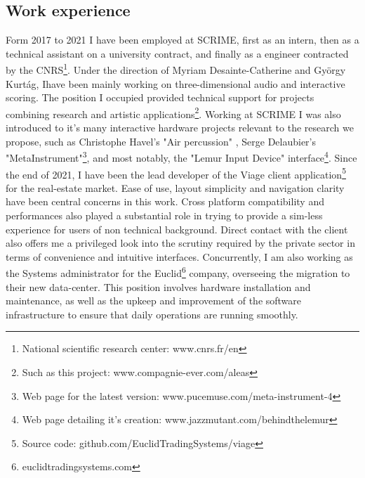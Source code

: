 \documentclass[journal,onecolumn]{IEEEtran}
\begin{document}
\subsection{Work experience} %
Form 2017 to 2021 I have been employed at SCRIME, first as an intern, then as a technical assistant on a university contract, and finally as a engineer contracted by the CNRS\footnote{National scientific research center: www.cnrs.fr/en}. Under the direction of Myriam Desainte-Catherine and György Kurtág, Ihave been mainly working on three-dimensional audio and interactive scoring. The position I occupied provided technical support for projects combining research and artistic applications\footnote{Such as this project: www.compagnie-ever.com/aleas}. Working at SCRIME I was also introduced to it's many interactive hardware projects relevant to the research we propose, such as Christophe Havel's "Air percussion" \cite{havel:air}, Serge Delaubier's "MetaInstrument"\footnote{Web page for the latest version: www.pucemuse.com/meta-instrument-4}, and most notably, the "Lemur Input Device" interface\footnote{Web page detailing it's creation: www.jazzmutant.com/behindthelemur}.
Since the end of 2021, I have been the lead developer of the Viage client application\footnote{Source code: github.com/EuclidTradingSystems/viage} for the real-estate market. Ease of use, layout simplicity and navigation clarity have been central concerns in this work. Cross platform compatibility and performances also played a substantial role in trying to provide a sim-less experience for users of non technical background. Direct contact with the client also offers me a privileged look into the scrutiny required by the private sector in terms of convenience and intuitive interfaces. Concurrently, I am also working as the Systems administrator for the Euclid\footnote{euclidtradingsystems.com} company, overseeing the migration to their new data-center. This position involves hardware installation and maintenance, as well as the upkeep and improvement of the software infrastructure to ensure that daily operations are running smoothly. 
\end{document}
